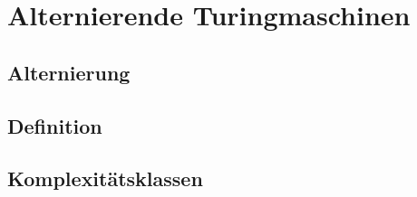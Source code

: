 \chapter{Alternierende Turingmaschinen} \label{chapter: Alternierende Turingmaschinen}


\section{Alternierung} \label{section: Alternierung}

\section{Definition} \label{section: definition}

\section{Komplexitätsklassen} \label{section: Komplexitätsklassen bei alternierenden TMs}